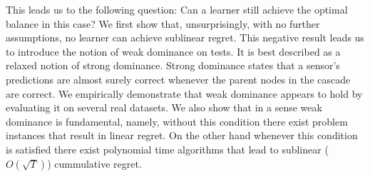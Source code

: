 

This leads us to the following question: Can a learner still achieve the optimal balance in this case?  We first show that, unsurprisingly, with no further assumptions, no learner can achieve sublinear regret. 
This negative result leads us to introduce the notion of weak dominance on tests. It is best described as a relaxed notion of strong dominance. Strong dominance states that a sensor's predictions are almost surely correct whenever the parent nodes in the cascade are correct.  We empirically demonstrate that weak dominance appears to hold by evaluating it on several real datasets. We also show that in a sense weak dominance is fundamental, namely, without this condition there exist problem instances that result in linear regret. On the other hand whenever this condition is satisfied there exist polynomial time algorithms that lead to sublinear ($O(\sqrt{T})$) cummulative regret. 

